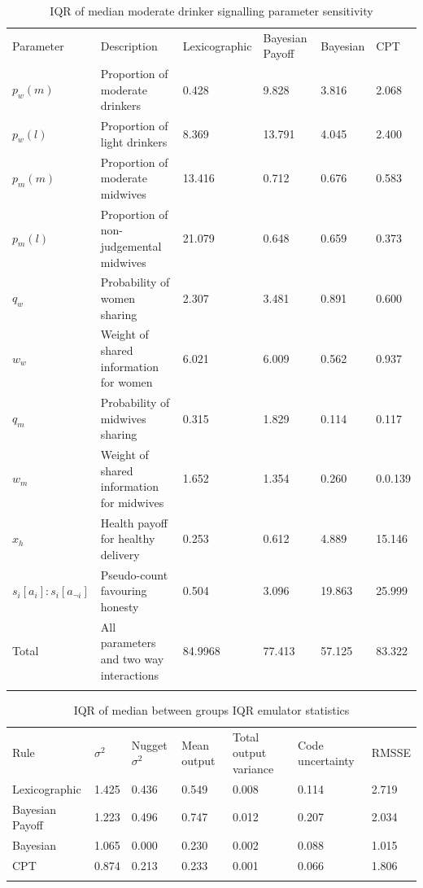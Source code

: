 \documentclass[graybox]{svmult}
\begin{document}
\begin{table}[H]
\caption{IQR of median moderate drinker signalling parameter sensitivity \label{tab:sa_results_sig_iqr}}
\begin{tabular} {llllll}
\hline\noalign{\smallskip}
Parameter & Description & Lexicographic & Bayesian Payoff & Bayesian & \ac{CPT} \\
\noalign{\smallskip}\svhline\noalign{\smallskip}
\(p_{w}(m)\) & Proportion of moderate drinkers & 0.428 & 9.828 & 3.816 & 2.068 \\
\(p_{w}(l)\) & Proportion of light drinkers & 8.369 & 13.791 & 4.045 & 2.400 \\
\(p_{m}(m)\) & Proportion of moderate midwives & 13.416 & 0.712 & 0.676 & 0.583 \\
\(p_{m}(l)\) & Proportion of non-judgemental midwives & 21.079 & 0.648 & 0.659 & 0.373 \\
\(q_{w}\) & Probability of women sharing & 2.307 & 3.481 & 0.891 & 0.600 \\
\(w_{w}\) & Weight of shared information for women & 6.021 & 6.009 & 0.562 & 0.937 \\
\(q_{m}\) & Probability of midwives sharing & 0.315 & 1.829 & 0.114 & 0.117 \\
\(w_{m}\) & Weight of shared information for midwives & 1.652 & 1.354 & 0.260 & 0.0.139 \\
\(x_{h}\) & Health payoff for healthy delivery & 0.253 & 0.612 & 4.889 & 15.146 \\
\(s_{i}[a_{i}]:s_{i}[a_{\neg i}]\) & Pseudo-count favouring honesty & 0.504 & 3.096 & 19.863 & 25.999 \\
Total & All parameters and two way interactions & 84.9968 & 77.413 & 57.125 & 83.322 \\
\noalign{\smallskip}\hline\noalign{\smallskip}
\end{tabular}
\end{table}

\begin{table}[H]
\caption{IQR of median between groups IQR emulator statistics \label{tab:sa_emulator_sig_iqr}}
\begin{tabular} {lllllll}
\hline\noalign{\smallskip}
Rule & \(\sigma^2\) & Nugget \(\sigma^2\) & Mean output & Total output variance & Code uncertainty & RMSSE \\
\noalign{\smallskip}\svhline\noalign{\smallskip}
Lexicographic & 1.425 & 0.436 & 0.549 & 0.008 & 0.114 & 2.719 \\
Bayesian Payoff & 1.223 & 0.496 & 0.747 & 0.012 & 0.207 & 2.034 \\
Bayesian &  1.065 & 0.000 & 0.230 & 0.002 & 0.088 & 1.015 \\
\ac{CPT} & 0.874 & 0.213 & 0.233 & 0.001 & 0.066 & 1.806 \\
\noalign{\smallskip}\hline\noalign{\smallskip}
\end{tabular}
\end{table}
\end{document}
